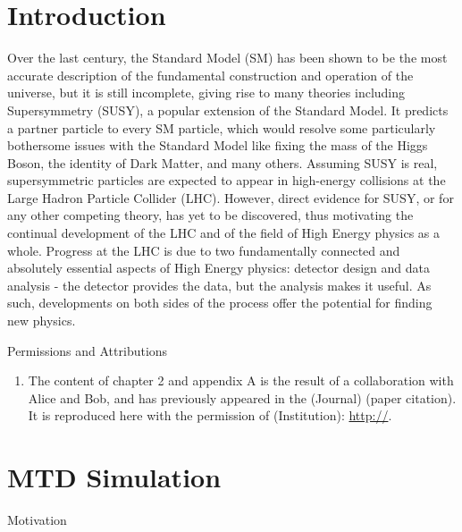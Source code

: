 \documentclass[oneside,12pt,final]{sty/ucthesis-CA2012}
\begin{document}
\begin{mainmatter}
\chapter{Introduction}
Over the last century, the Standard Model (SM) has been shown to be the most accurate description of the fundamental construction and operation of the universe, but it is still incomplete, giving rise to many theories including Supersymmetry (SUSY), a popular extension of the Standard Model. It predicts a partner particle to every SM particle, which would resolve some particularly bothersome issues with the Standard Model like fixing the mass of the Higgs Boson, the identity of Dark Matter, and many others. Assuming SUSY is real, supersymmetric particles are expected to appear in high-energy collisions at the Large Hadron Particle Collider (LHC). However, direct evidence for SUSY, or for any other competing theory, has yet to be discovered, thus motivating the continual development of the LHC and of the field of High Energy physics as a whole. Progress at the LHC is due to two fundamentally connected and absolutely essential aspects of High Energy physics: detector design and data analysis - the detector provides the data, but the analysis makes it useful. As such, developments on both sides of the process offer the potential for finding new physics.
\begin{section}{Permissions and Attributions}
\begin{enumerate}

\item The content of chapter 2 and appendix A is the result of a collaboration with Alice and Bob, and has previously appeared in the (Journal) (paper citation). It is reproduced here with the permission of (Institution): \url{http://}.

\end{enumerate}
\end{section}

\chapter{MTD Simulation}
\begin{section}{Motivation}


\end{section}
\end{mainmatter}
\end{document}
